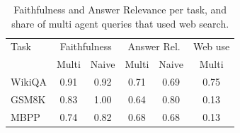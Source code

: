 \begin{table}[!tb]
\centering
\caption{Faithfulness and Answer Relevance per task, and share of multi agent queries that used web search.}
\label{tab:pertask}
\small
\begin{tabular}{lccccc}
\toprule
Task & \multicolumn{2}{c}{Faithfulness} & \multicolumn{2}{c}{Answer Rel.} & Web use \\
 & Multi & Naive & Multi & Naive & Multi \\
\midrule
WikiQA & 0.91 & 0.92 & 0.71 & 0.69 & 0.75 \\
GSM8K & 0.83 & 1.00 & 0.64 & 0.80 & 0.13 \\
MBPP & 0.74 & 0.82 & 0.68 & 0.68 & 0.13 \\
\bottomrule
\end{tabular}
\end{table}

